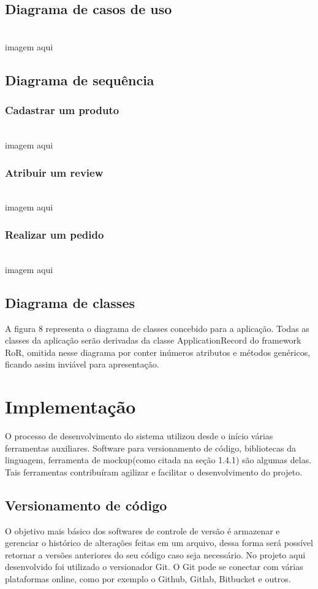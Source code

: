 \subsection{Diagrama de casos de uso}
\\ imagem aqui

\subsection{Diagrama de sequência}
\subsubsection{Cadastrar um produto}
\\ imagem aqui
\subsubsection{Atribuir um review}
\\ imagem aqui
\subsubsection{Realizar um pedido}
\\ imagem aqui

\subsection{Diagrama de classes}
A figura 8 representa o diagrama de classes concebido para a aplicação. Todas as classes da aplicação serão derivadas da classe ApplicationRecord do framework RoR, omitida nesse diagrama por conter inúmeros atributos e métodos genéricos, ficando assim inviável para apresentação.

\section{Implementação}
O processo de desenvolvimento do sistema utilizou desde o início várias ferramentas auxiliares. Software para versionamento de código, bibliotecas da linguagem, ferramenta de mockup(como citada na seção 1.4.1) são algumas delas. Tais ferramentas contribuíram agilizar e facilitar o desenvolvimento do projeto.
\subsection{Versionamento de código}
O objetivo mais básico dos softwares de controle de versão é armazenar e gerenciar o histórico de alterações feitas em um arquivo, dessa forma será possível retornar a versões anteriores do seu código caso seja necessário. No projeto aqui desenvolvido foi utilizado o versionador Git. O Git pode se conectar com várias plataformas online, como por exemplo o Github, Gitlab, Bitbucket e outros.

